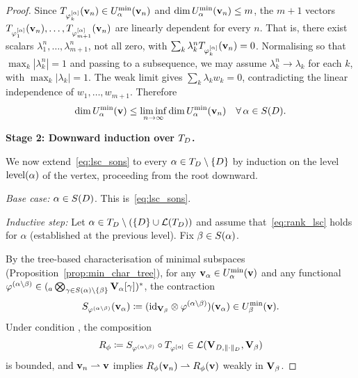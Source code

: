\begin{proof}
Since $T_{\varphi^{[\alpha]}_k}(\mathbf{v}_n) \in U^{\min}_{\alpha}(\mathbf{v}_n)$ and
$\dim U^{\min}_{\alpha}(\mathbf{v}_n) \leq m$, the $m+1$ vectors
$T_{\varphi^{[\alpha]}_1}(\mathbf{v}_n), \ldots, T_{\varphi^{[\alpha]}_{m+1}}(\mathbf{v}_n)$
are linearly dependent for every $n$. That is, there exist scalars
$\lambda^n_1, \ldots, \lambda^n_{m+1}$, not all zero, with
$\sum_k \lambda^n_k T_{\varphi^{[\alpha]}_k}(\mathbf{v}_n) = 0$.
Normalising so that $\max_k |\lambda^n_k| = 1$ and passing to a
subsequence, we may assume $\lambda^n_k \to \lambda_k$ for each $k$,
with $\max_k |\lambda_k| = 1$. The weak limit gives
$\sum_k \lambda_k w_k = 0$, contradicting the linear independence of
$w_1, \ldots, w_{m+1}$. Therefore
\begin{equation}
\label{eq:lsc_sons}
    \dim U^{\min}_{\alpha}(\mathbf{v}) \leq
    \liminf_{n \to \infty} \dim U^{\min}_{\alpha}(\mathbf{v}_n)
    \quad \forall\, \alpha \in S(D).
\end{equation}

\medskip
\noindent\textbf{Stage 2: Downward induction over $T_D$.}

We now extend~\eqref{eq:lsc_sons} to every $\alpha \in T_D \setminus
\{D\}$ by induction on the level $\mathrm{level}(\alpha)$ of the vertex,
proceeding from the root downward.

\textit{Base case:} $\alpha \in S(D)$. This is~\eqref{eq:lsc_sons}.

\textit{Inductive step:} Let $\alpha \in T_D \setminus (\{D\} \cup \mathcal{L}(T_D))$
and assume that~\eqref{eq:rank_lsc} holds for $\alpha$ (established
at the previous level). Fix $\beta \in S(\alpha)$.

By the tree-based characterisation of minimal subspaces
(Proposition~\ref{prop:min_char_tree}), for any
$\mathbf{v}_\alpha \in U^{\min}_{\alpha}(\mathbf{v})$ and any functional
$\varphi^{(\alpha \setminus \beta)} \in
({}_a\bigotimes_{\gamma \in S(\alpha) \setminus \{\beta\}}
\mathbf{V}_\alpha[\gamma])^*$, the contraction
\begin{equation*}
    S_{\varphi^{(\alpha \setminus \beta)}}(\mathbf{v}_\alpha)
    \coloneqq
    (\mathrm{id}_{\mathbf{V}_\beta} \otimes \varphi^{(\alpha \setminus \beta)})(\mathbf{v}_\alpha)
    \in U^{\min}_{\beta}(\mathbf{v}).
\end{equation*}
Under condition \condINJ[$T_D$], the composition
\begin{equation*}
    R_\phi \coloneqq S_{\varphi^{(\alpha \setminus \beta)}} \circ
    T_{\varphi^{[\alpha]}}
    \in \mathcal{L}(\mathbf{V}_{D,\|\cdot\|_D}, \mathbf{V}_\beta)
\end{equation*}
is bounded, and $\mathbf{v}_n \rightharpoonup \mathbf{v}$ implies
$R_\phi(\mathbf{v}_n) \rightharpoonup R_\phi(\mathbf{v})$ weakly in $\mathbf{V}_\beta$.


\end{proof}
